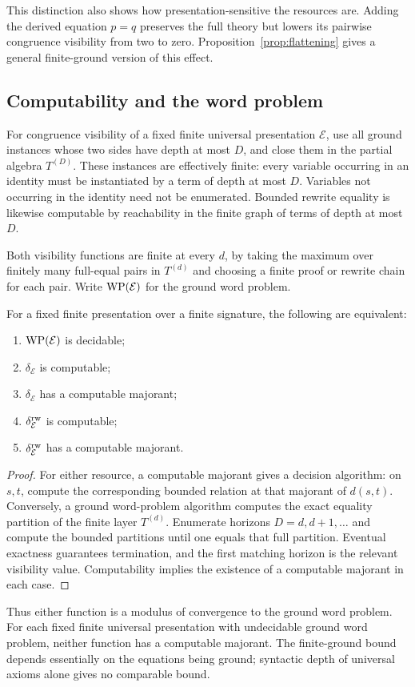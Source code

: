 This distinction also shows how presentation-sensitive the resources are. Adding the derived equation $p=q$ preserves the full theory but lowers its pairwise congruence visibility from two to zero. Proposition~\ref{prop:flattening} gives a general finite-ground version of this effect.

\subsection{Computability and the word problem}
For congruence visibility of a fixed finite universal presentation $\mathcal E$, use all ground instances whose two sides have depth at most $D$, and close them in the partial algebra $T^{(D)}$. These instances are effectively finite: every variable occurring in an identity must be instantiated by a term of depth at most $D$. Variables not occurring in the identity need not be enumerated. Bounded rewrite equality is likewise computable by reachability in the finite graph of terms of depth at most $D$.

Both visibility functions are finite at every $d$, by taking the maximum over finitely many full-equal pairs in $T^{(d)}$ and choosing a finite proof or rewrite chain for each pair. Write $\operatorname{WP}(\mathcal E)$ for the ground word problem.

\begin{theorem}\label{thm:wp}
For a fixed finite presentation over a finite signature, the following are equivalent:
\begin{enumerate}[label=(\arabic*)]
\item $\operatorname{WP}(\mathcal E)$ is decidable;
\item $\delta_{\mathcal E}$ is computable;
\item $\delta_{\mathcal E}$ has a computable majorant;
\item $\delta^{\mathrm{rw}}_{\mathcal E}$ is computable;
\item $\delta^{\mathrm{rw}}_{\mathcal E}$ has a computable majorant.
\end{enumerate}
\end{theorem}
\begin{proof}
For either resource, a computable majorant gives a decision algorithm: on $s,t$, compute the corresponding bounded relation at that majorant of $d(s,t)$. Conversely, a ground word-problem algorithm computes the exact equality partition of the finite layer $T^{(d)}$. Enumerate horizons $D=d,d+1,\ldots$ and compute the bounded partitions until one equals that full partition. Eventual exactness guarantees termination, and the first matching horizon is the relevant visibility value. Computability implies the existence of a computable majorant in each case.
\end{proof}

Thus either function is a modulus of convergence to the ground word problem. For each fixed finite universal presentation with undecidable ground word problem, neither function has a computable majorant. The finite-ground bound depends essentially on the equations being ground; syntactic depth of universal axioms alone gives no comparable bound.
